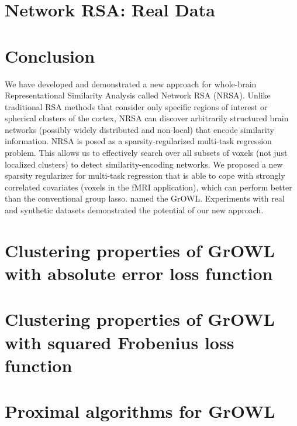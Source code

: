 \documentclass{article}
\begin{document}
	\section{Network RSA: Real Data}
        \label{wbrsa2}
	
	
	\section{Conclusion}
We have developed and demonstrated a new approach for whole-brain Representational Similarity Analysis called Network RSA (NRSA). Unlike traditional RSA methods that consider only specific regions of interest or spherical clusters of the cortex,  NRSA can discover arbitrarily structured brain networks (possibly widely distributed and non-local) that encode similarity information.  NRSA is posed as a sparsity-regularized multi-task regression problem. This allows us to effectively search over all subsets of voxels (not just localized clusters) to detect similarity-encoding networks.  We proposed a new sparsity regularizer for multi-task regression that is able to cope with strongly correlated covariates (voxels in the fMRI application),
which can perform better than the conventional group lasso. named the GrOWL.  Experiments with real and synthetic datasets demonstrated the potential of our new approach.
	
	\section{Clustering properties of GrOWL with absolute error loss function}
	
	
	\section{Clustering properties of GrOWL with squared Frobenius loss function}
	
	
	\section{Proximal algorithms for GrOWL}
	
	

\nocite{langley00}
\end{document}

